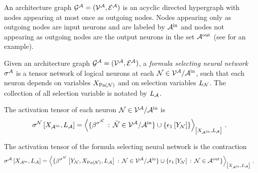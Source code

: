 \begin{definition}
    \label{def:fsNeuralNetwork}


    An architecture graph $\mathcal{G}^{\mathcal{A}}=(\mathcal{V}^{\mathcal{A}},\mathcal{E}^{\mathcal{A}})$ is an acyclic directed hypergraph with nodes appearing at most once as outgoing nodes.
    Nodes appearing only as outgoing nodes are input neurons and are labeled by $\mathcal{A}^{\mathrm{in}}$ and nodes not appearing as outgoing nodes are the output neurons in the set $\mathcal{A}^{\mathrm{out}}$ (see  for an example).

    Given an architecture graph $\mathcal{G}^{\mathcal{A}}=(\mathcal{V}^{\mathcal{A}},\mathcal{E}^{\mathcal{A}})$, a \emph{formula selecting neural network} $\sigma^{\mathcal{A}}$ is a tensor network of logical neurons at each $\mathcal{N}\in\mathcal{V}^{\mathcal{A}}/\mathcal{A}^{\mathrm{in}}$, such that each neuron depends on variables $X_{\mathrm{Pa}(\mathcal{N})}$ and on selection variables $L_{\mathcal{N}}$.
    The collection of all selection variable is notated by $L_{\mathcal{A}}$.

    The activation tensor of each neuron $\mathcal{N}\in\mathcal{V}^{\mathcal{A}}/\mathcal{A}^{\mathrm{in}}$ is
    \begin{align*}
        \sigma^{\mathcal{N}}\left[X_{\mathcal{A}^{\mathrm{in}}},L_{\mathcal{A}}\right]
        = \left\langle 
            \{\beta^{\sigma^{\tilde{\mathcal{N}}}} \,:\, \tilde{\mathcal{N}}\in\mathcal{V}^{\mathcal{A}}/\mathcal{A}^{\mathrm{in}} \} \cup \{\epsilon_{1}\left[Y_{\mathcal{N}}\right]\}
        \right\rangle_{\left[ X_{\mathcal{A}^{\mathrm{in}}},L_{\mathcal{A}} \right]} \, .
    \end{align*}

    The activation tensor of the formula selecting neural network is the contraction
    \begin{align*}
        \fsnnat{\catvariableof{\inneuronset},\selvariableof{\larchitecture}}
        = \contractionof{
            \{\bencodingofat{\lneuractivation}{\headvariableof{\lneuron},\catvariableof{\parentsof{\lneuron}},\selvariableof{\larchitecture}} \wcols \lneuron\in\nodesof{\larchitecture}/\inneuronset \} \cup \{\tbasisat{\headvariableof{\lneuron}} \wcols \lneuron\in\outneuronset\}
        }{\catvariableof{\inneuronset},\selvariableof{\larchitecture}} \, .
    \end{align*}


\end{definition}
